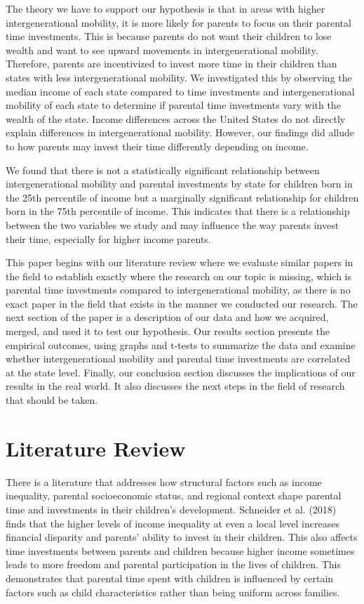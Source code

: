 \documentclass[12pt]{article}
\begin{document}
The theory we have to support our hypothesis is that in areas with higher intergenerational mobility, it is more likely for parents to focus on their parental time investments. This is because parents do not want their children to lose wealth and want to see upward movements in intergenerational mobility. Therefore, parents are incentivized to invest more time in their children than states with less intergenerational mobility. We investigated this by observing the median income of each state compared to time investments and intergenerational mobility of each state to determine if parental time investments vary with the wealth of the state. Income differences across the United States do not directly explain differences in intergenerational mobility. However, our findings did allude to how parents may invest their time differently depending on income. 

We found that there is not a statistically significant relationship between intergenerational mobility and parental investments by state for children born in the 25th percentile of income but a marginally significant relationship for children born in the 75th percentile of income. This indicates that there is a relationship between the two variables we study and may influence the way parents invest their time, especially for higher income parents. 

This paper begins with our literature review where we evaluate similar papers in the field to establish exactly where the research on our topic is missing, which is parental time investments compared to intergenerational mobility, as there is no exact paper in the field that exists in the manner we conducted our research. The next section of the paper is a description of our data and how we acquired, merged, and used it to test our hypothesis. Our results section presents the empirical outcomes, using graphs and t-tests to summarize the data and examine whether intergenerational mobility and parental time investments are correlated at the state level. Finally, our conclusion section discusses the implications of our results in the real world. It also discusses the next steps in the field of research that should be taken. 

\section{Literature Review} \label{'sec:literature'}

There is a literature that addresses how structural factors such as income inequality, parental socioeconomic status, and regional context shape parental time and investments in their children’s development. Schneider et al. (2018) finds that the higher levels of income inequality at even a local level increases financial disparity and parents' ability to invest in their children. This also affects time investments between parents and children because higher income sometimes leads to more freedom and parental participation in the lives of children. This demonstrates that parental time spent with children is influenced by certain factors such as child characteristics rather than being uniform across families. 
\end{document}
